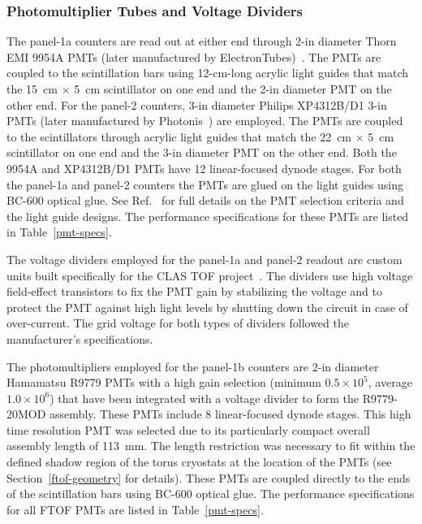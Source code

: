 \documentclass{elsart}
\begin{document}
\subsubsection{Photomultiplier Tubes and Voltage Dividers}

The panel-1a counters are read out at either end through 2-in diameter Thorn EMI 9954A PMTs (later
manufactured by ElectronTubes)~\cite{et-ref}. The PMTs are coupled to the scintillation bars using
12-cm-long acrylic light guides that match the 15~cm $\times$ 5~cm scintillator on one end and the
2-in diameter PMT on the other end.  For the panel-2 counters, 3-in diameter Philips XP4312B/D1 3-in
PMTs (later manufactured by Photonis~\cite{photonis}) are employed. The PMTs are coupled to the
scintillators through acrylic light guides that match the 22~cm $\times$ 5~cm scintillator on one end
and the 3-in diameter PMT on the other end. Both the 9954A and XP4312B/D1 PMTs have 12
linear-focused dynode stages. For both the panel-1a and panel-2 counters the PMTs are glued on the
light guides using BC-600 optical glue. See Ref.~\cite{tof-nim} for full details on the PMT selection
criteria and the light guide designs. The performance specifications for these PMTs are listed in
Table~\ref{pmt-specs}.

The voltage dividers employed for the panel-1a and panel-2 readout are custom units built specifically
for the CLAS TOF project~\cite{tof-nim}. The dividers use high voltage field-effect transistors to fix
the PMT gain by stabilizing the voltage and to protect the PMT against high light levels by shutting down
the circuit in case of over-current. The grid voltage for both types of dividers followed the
manufacturer's specifications.

The photomultipliers employed for the panel-1b counters are 2-in diameter Hamamatsu R9779 PMTs with
a high gain selection (minimum $0.5 \times 10^5$, average $1.0 \times 10^6$) that have been integrated
with a voltage divider to form the R9779-20MOD assembly. These PMTs include 8 linear-focused dynode
stages. This high time resolution PMT was selected due to its particularly compact overall assembly length
of 113~mm. The length restriction was necessary to fit within the defined shadow region of the torus
cryostats at the location of the PMTs (see Section~\ref{ftof-geometry} for details). These PMTs are
coupled directly to the ends of the scintillation bars using BC-600 optical glue. The performance
specifications for all FTOF PMTs are listed in Table~\ref{pmt-specs}.
\end{document}
